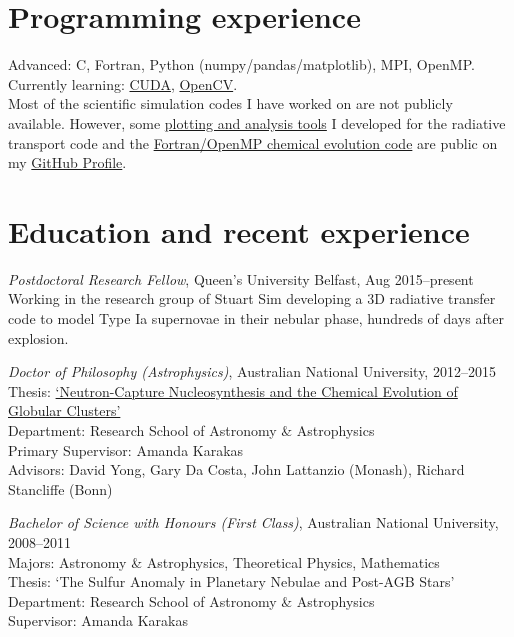 \documentclass[11pt]{res} %
\begin{document}
\begin{resume}
\section{Programming experience}
  Advanced: C, Fortran, Python (numpy/pandas/matplotlib), MPI, OpenMP.\\
  Currently learning: \href{https://github.com/lukeshingles/cuda-examples}{CUDA}, \href{https://github.com/lukeshingles/opencv-examples}{OpenCV}.\\
  Most of the scientific simulation codes I have worked on are not publicly available. However, some \href{https://github.com/lukeshingles/artistools}{plotting and analysis tools} I developed for the radiative transport code and the \href{https://github.com/lukeshingles/evelchemevol}{Fortran/OpenMP chemical evolution code} are public on my \href{https://github.com/lukeshingles}{GitHub Profile}.

\section{Education and recent experience}
  {\it Postdoctoral Research Fellow}, Queen's University Belfast, Aug 2015--present\\
  Working in the research group of Stuart Sim developing a 3D radiative transfer code to model Type Ia supernovae in their nebular phase, hundreds of days after explosion.

  {\it Doctor of Philosophy (Astrophysics)}, Australian National University, 2012--2015\\
  Thesis: \href{https://openresearch-repository.anu.edu.au/handle/1885/16507}{`Neutron-Capture Nucleosynthesis and the Chemical Evolution of Globular Clusters'}\\
  Department: Research School of Astronomy \& Astrophysics\\
  Primary Supervisor: Amanda Karakas\\
  Advisors: David Yong, Gary Da Costa, John Lattanzio (Monash), Richard Stancliffe (Bonn)

  {\it Bachelor of Science with Honours (First Class)}, Australian National University, 2008--2011\\
  Majors: Astronomy \& Astrophysics, Theoretical Physics, Mathematics\\
  Thesis: `The Sulfur Anomaly in Planetary Nebulae and Post-AGB Stars'\\
  Department: Research School of Astronomy \& Astrophysics\\
  Supervisor: Amanda Karakas


\end{resume}
\end{document}
